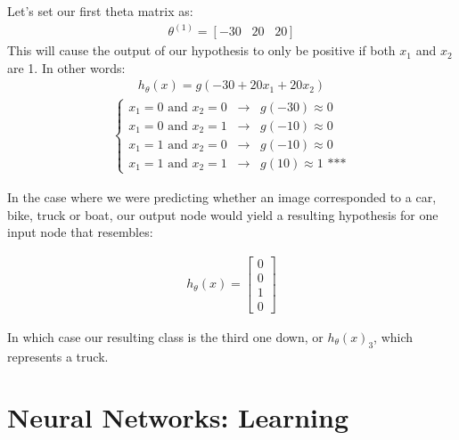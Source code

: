 \documentclass{article}
\begin{document}
            Let's set our first theta matrix as:
            \begin{align*}
                \theta^{(1)} = [-30 \; \; \; 20 \; \; \; 20]
            \end{align*}
            This will cause the output of our hypothesis to only be positive if both $x_1$ and $x_2$ are 1. In other words:
            \begin{align*}
                h_{\theta}(x) = g(-30 + 20x_1 + 20x_2)
            \end{align*}
            \begin{align*}
                \begin{cases}
                    x_1 = 0 \text{  and  } x_2 = 0 \; \; \longrightarrow \; \; g(-30) \approx 0 \\
                    x_1 = 0 \text{  and  } x_2 = 1 \; \; \longrightarrow \; \; g(-10) \approx 0 \\
                    x_1 = 1 \text{  and  } x_2 = 0 \; \; \longrightarrow \; \; g(-10) \approx 0 \\
                    x_1 = 1 \text{  and  } x_2 = 1 \; \; \longrightarrow \; \; g(10) \approx 1 \text{  ***}
                \end{cases}
            \end{align*}

            In the case where we were predicting whether an image corresponded to a car, bike, truck or boat, our output node would yield a resulting hypothesis for one input node that resembles:

            \begin{align*}
                h_{\theta}(x) = 
                \begin{bmatrix}
                    0 \\
                    0 \\
                    1 \\
                    0
                \end{bmatrix}
            \end{align*}

            In which case our resulting class is the third one down, or $h_{\theta}(x)_3$, which represents a truck.

    \section{Neural Networks: Learning}
\end{document}
